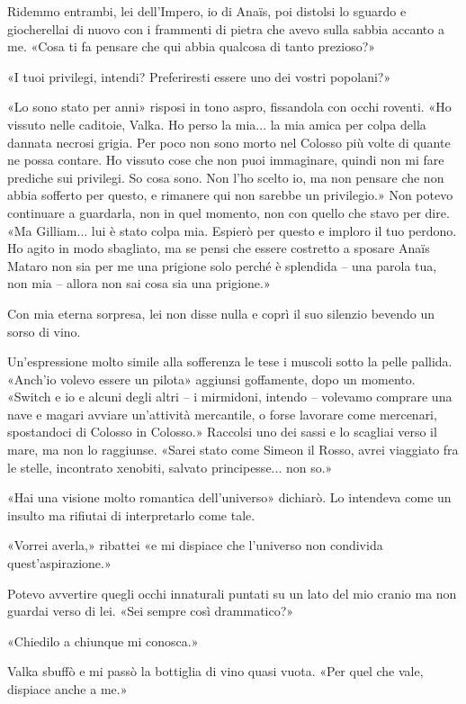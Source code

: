 Ridemmo entrambi, lei dell'Impero, io di Anaïs, poi distolsi lo sguardo
e giocherellai di nuovo con i frammenti di pietra che avevo sulla sabbia
accanto a me. «Cosa ti fa pensare che qui abbia qualcosa di tanto
prezioso?»

«I tuoi privilegi, intendi? Preferiresti essere uno dei vostri
popolani?»

«Lo sono stato per anni» risposi in tono aspro, fissandola con occhi
roventi. «Ho vissuto nelle caditoie, Valka. Ho perso la mia... la mia
amica per colpa della dannata necrosi grigia. Per poco non sono morto
nel Colosso più volte di quante ne possa contare. Ho vissuto cose che
non puoi immaginare, quindi non mi fare prediche sui privilegi. So cosa
sono. Non l'ho scelto io, ma non pensare che non abbia sofferto per
questo, e rimanere qui non sarebbe un privilegio.» Non potevo continuare
a guardarla, non in quel momento, non con quello che stavo per dire. «Ma
Gilliam... lui è stato colpa mia. Espierò per questo e imploro il tuo
perdono. Ho agito in modo sbagliato, ma se pensi che essere costretto a
sposare Anaïs Mataro non sia per me una prigione solo perché è splendida
-- una parola tua, non mia -- allora non sai cosa sia una prigione.»

Con mia eterna sorpresa, lei non disse nulla e coprì il suo silenzio
bevendo un sorso di vino.

Un'espressione molto simile alla sofferenza le tese i muscoli sotto la
pelle pallida. «Anch'io volevo essere un pilota» aggiunsi goffamente,
dopo un momento. «Switch e io e alcuni degli altri -- i mirmidoni,
intendo -- volevamo comprare una nave e magari avviare un'attività
mercantile, o forse lavorare come mercenari, spostandoci di Colosso in
Colosso.» Raccolsi uno dei sassi e lo scagliai verso il mare, ma non lo
raggiunse. «Sarei stato come Simeon il Rosso, avrei viaggiato fra le
stelle, incontrato xenobiti, salvato principesse... non so.»

«Hai una visione molto romantica dell'universo» dichiarò. Lo intendeva
come un insulto ma rifiutai di interpretarlo come tale.

«Vorrei averla,» ribattei «e mi dispiace che l'universo non condivida
quest'aspirazione.»

Potevo avvertire quegli occhi innaturali puntati su un lato del mio
cranio ma non guardai verso di lei. «Sei sempre così drammatico?»

«Chiedilo a chiunque mi conosca.»

Valka sbuffò e mi passò la bottiglia di vino quasi vuota. «Per quel che
vale, dispiace anche a me.»

